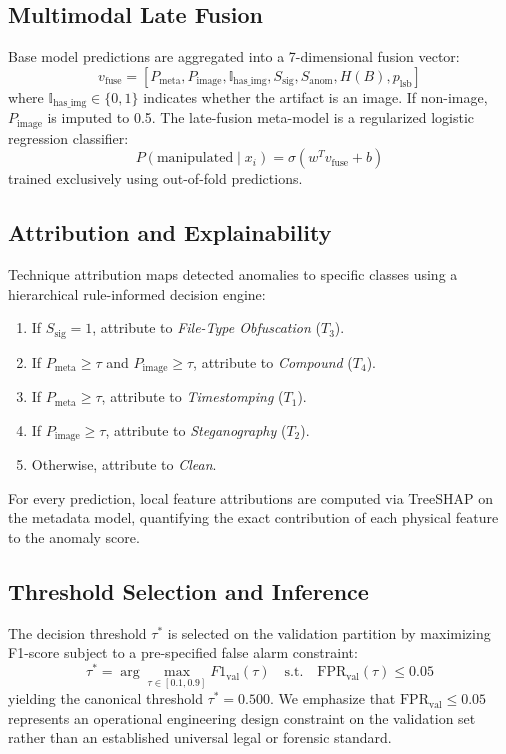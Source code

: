 \documentclass[conference]{IEEEtran}
\begin{document}
\subsection{Multimodal Late Fusion}
Base model predictions are aggregated into a 7-dimensional fusion vector:
\begin{equation}
    v_{\text{fuse}} = [P_{\text{meta}}, P_{\text{image}}, \mathbb{I}_{\text{has\_img}}, S_{\text{sig}}, S_{\text{anom}}, H(B), p_{\text{lsb}}]
\end{equation}
where $\mathbb{I}_{\text{has\_img}} \in \{0, 1\}$ indicates whether the artifact is an image. If non-image, $P_{\text{image}}$ is imputed to 0.5. The late-fusion meta-model is a regularized logistic regression classifier:
\begin{equation}
    P(\text{manipulated} \mid x_i) = \sigma(w^T v_{\text{fuse}} + b)
\end{equation}
trained exclusively using out-of-fold predictions.

\subsection{Attribution and Explainability}
Technique attribution maps detected anomalies to specific classes using a hierarchical rule-informed decision engine:
\begin{enumerate}
    \item If $S_{\text{sig}} = 1$, attribute to \textit{File-Type Obfuscation} ($T_3$).
    \item If $P_{\text{meta}} \ge \tau$ and $P_{\text{image}} \ge \tau$, attribute to \textit{Compound} ($T_4$).
    \item If $P_{\text{meta}} \ge \tau$, attribute to \textit{Timestomping} ($T_1$).
    \item If $P_{\text{image}} \ge \tau$, attribute to \textit{Steganography} ($T_2$).
    \item Otherwise, attribute to \textit{Clean}.
\end{enumerate}
For every prediction, local feature attributions are computed via TreeSHAP on the metadata model, quantifying the exact contribution of each physical feature to the anomaly score.

\subsection{Threshold Selection and Inference}
The decision threshold $\tau^*$ is selected on the validation partition by maximizing F1-score subject to a pre-specified false alarm constraint:
\begin{equation}
    \tau^* = \arg\max_{\tau \in [0.1, 0.9]} F1_{\text{val}}(\tau) \quad \text{s.t.} \quad \text{FPR}_{\text{val}}(\tau) \le 0.05
\end{equation}
yielding the canonical threshold $\tau^* = 0.500$. We emphasize that $\text{FPR}_{\text{val}} \le 0.05$ represents an operational engineering design constraint on the validation set rather than an established universal legal or forensic standard.
\end{document}
